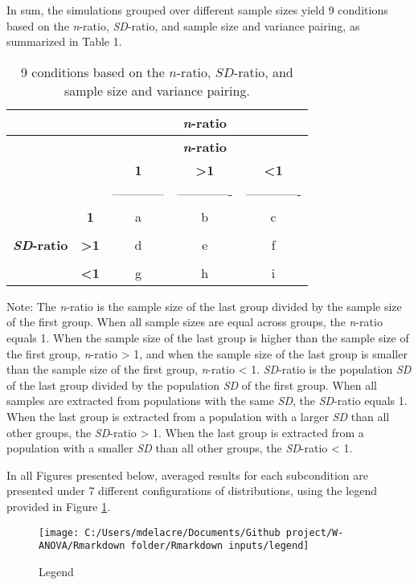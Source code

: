 \documentclass[
  english,
  man]{apa6}
\begin{document}
In sum, the simulations grouped over different sample sizes yield 9 conditions based on the \emph{n}-ratio, \emph{SD}-ratio, and sample size and variance pairing, as summarized in Table 1.

\begin{longtable}[]{@{}ccccc@{}}
\caption{9 conditions based on the \(n\)-ratio, \(SD\)-ratio, and sample size and variance pairing.}\tabularnewline
\toprule
& & & \textbf{\emph{n}-ratio} & \\
\midrule
\endfirsthead
\toprule
& & & \textbf{\emph{n}-ratio} & \\
\midrule
\endhead
& & \textbf{1} & \textbf{\textgreater1} & \textbf{\textless1} \\
& & ------------ & ------------- & ------------- \\
& \textbf{1} & a & b & c \\
& & & & \\
\textbf{\emph{SD}-ratio} & \textbf{\textgreater1} & d & e & f \\
& & & & \\
& \textbf{\textless1} & g & h & i \\
\bottomrule
\end{longtable}

Note: The \emph{n}-ratio is the sample size of the last group divided by the sample size of the first group. When all sample sizes are equal across groups, the \emph{n}-ratio equals 1. When the sample size of the last group is higher than the sample size of the first group, \emph{n}-ratio \textgreater{} 1, and when the sample size of the last group is smaller than the sample size of the first group, \emph{n}-ratio \textless{} 1. \emph{SD}-ratio is the population \emph{SD} of the last group divided by the population \emph{SD} of the first group. When all samples are extracted from populations with the same \emph{SD}, the \emph{SD}-ratio equals 1. When the last group is extracted from a population with a larger \emph{SD} than all other groups, the \emph{SD}-ratio \textgreater{} 1. When the last group is extracted from a population with a smaller \emph{SD} than all other groups, the \emph{SD}-ratio \textless{} 1.

In all Figures presented below, averaged results for each subcondition are presented under 7 different configurations of distributions, using the legend provided in Figure \ref{fig:legendchp3}.

\begin{figure}
\texttt{[image: C:/Users/mdelacre/Documents/Github project/W-ANOVA/Rmarkdown folder/Rmarkdown inputs/legend]} \caption{Legend}\label{fig:legendchp3}
\end{figure}
\end{document}
